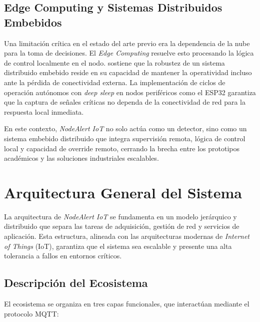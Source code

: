 \documentclass[11pt,a4paper]{article}
\begin{document}
\subsection{Edge Computing y Sistemas Distribuidos Embebidos}
Una limitación crítica en el estado del arte previo era la dependencia de la nube para la toma de decisiones. El \textit{Edge Computing} resuelve esto procesando la lógica de control localmente en el nodo. \citet{valvano2014volume1} sostiene que la robustez de un sistema distribuido embebido reside en su capacidad de mantener la operatividad incluso ante la pérdida de conectividad externa. La implementación de ciclos de operación autónomos con \textit{deep sleep} en nodos periféricos como el ESP32 garantiza que la captura de señales críticas no dependa de la conectividad de red para la respuesta local inmediata.

En este contexto, \textit{NodeAlert IoT} no solo actúa como un detector, sino como un sistema embebido distribuido que integra supervisión remota, lógica de control local y capacidad de override remoto, cerrando la brecha entre los prototipos académicos y las soluciones industriales escalables.

\section{Arquitectura General del Sistema}
La arquitectura de \textit{NodeAlert IoT} se fundamenta en un modelo jerárquico y distribuido que separa las tareas de adquisición, gestión de red y servicios de aplicación. Esta estructura, alineada con las arquitecturas modernas de \textit{Internet of Things} (IoT), garantiza que el sistema sea escalable y presente una alta tolerancia a fallos en entornos críticos.

\subsection{Descripción del Ecosistema}
El ecosistema se organiza en tres capas funcionales, que interactúan mediante el protocolo MQTT:
\end{document}
